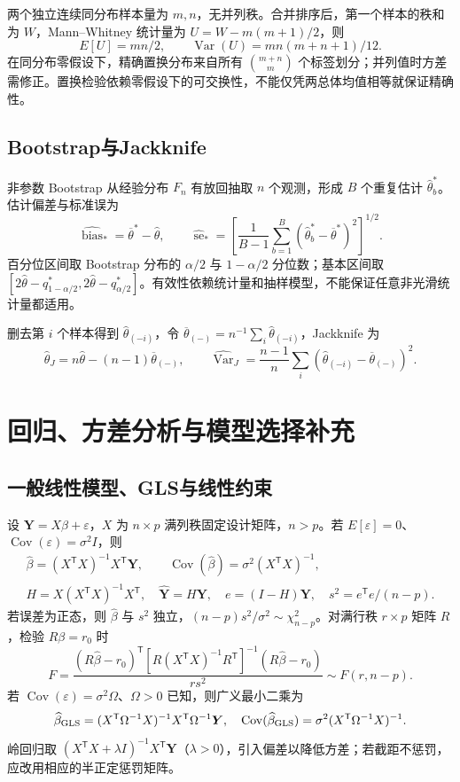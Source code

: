 \documentclass[../main.tex]{subfiles}
\begin{document}
两个独立连续同分布样本量为 $m,n$，无并列秩。合并排序后，第一个样本的秩和为 $W$，Mann--Whitney 统计量为 $U=W-m(m+1)/2$，则
\[
E[U]=mn/2,\qquad\operatorname{Var}(U)=mn(m+n+1)/12.
\]
在同分布零假设下，精确置换分布来自所有 $\binom{m+n}m$ 个标签划分；并列值时方差需修正。置换检验依赖零假设下的可交换性，不能仅凭两总体均值相等就保证精确性。

\subsection{Bootstrap与Jackknife}
非参数 Bootstrap 从经验分布 $F_n$ 有放回抽取 $n$ 个观测，形成 $B$ 个重复估计 $\widehat\theta_b^*$。估计偏差与标准误为
\[
\widehat{\operatorname{bias}}_* =\overline\theta^*-\widehat\theta,\qquad
\widehat{\operatorname{se}}_* =\left[\frac1{B-1}\sum_{b=1}^B(\widehat\theta_b^*-\overline\theta^*)^2\right]^{1/2}.
\]
百分位区间取 Bootstrap 分布的 $\alpha/2$ 与 $1-\alpha/2$ 分位数；基本区间取 $[2\widehat\theta-q^*_{1-\alpha/2},2\widehat\theta-q^*_{\alpha/2}]$。有效性依赖统计量和抽样模型，不能保证任意非光滑统计量都适用。

删去第 $i$ 个样本得到 $\widehat\theta_{(-i)}$，令 $\overline\theta_{(-)}=n^{-1}\sum_i\widehat\theta_{(-i)}$，Jackknife 为
\[
\widehat\theta_J=n\widehat\theta-(n-1)\overline\theta_{(-)},\qquad
\widehat{\operatorname{Var}}_J=\frac{n-1}n\sum_i(\widehat\theta_{(-i)}-\overline\theta_{(-)})^2.
\]

\section{回归、方差分析与模型选择补充}
\subsection{一般线性模型、GLS与线性约束}
设 $\bm Y=X\beta+\varepsilon$，$X$ 为 $n\times p$ 满列秩固定设计矩阵，$n>p$。若 $E[\varepsilon]=0$、$\operatorname{Cov}(\varepsilon)=\sigma^2I$，则
\begin{gather*}
\widehat\beta=(X^{\mathsf T}X)^{-1}X^{\mathsf T}\bm Y,\qquad
\operatorname{Cov}(\widehat\beta)=\sigma^2(X^{\mathsf T}X)^{-1},\\
H=X(X^{\mathsf T}X)^{-1}X^{\mathsf T},\quad \widehat{\bm Y}=H\bm Y,\quad
e=(I-H)\bm Y,\quad s^2=e^{\mathsf T}e/(n-p).
\end{gather*}
若误差为正态，则 $\widehat\beta$ 与 $s^2$ 独立，$(n-p)s^2/\sigma^2\sim\chi^2_{n-p}$。对满行秩 $r\times p$ 矩阵 $R$，检验 $R\beta=r_0$ 时
\[
F=\frac{(R\widehat\beta-r_0)^{\mathsf T}[R(X^{\mathsf T}X)^{-1}R^{\mathsf T}]^{-1}(R\widehat\beta-r_0)}{r s^2}
\sim F(r,n-p).
\]
若 $\operatorname{Cov}(\varepsilon)=\sigma^2\Omega$、$\Omega>0$ 已知，则广义最小二乘为
\[
\widehat\beta_{\rm GLS}=(X^{\mathsf T}\Omega^{-1}X)^{-1}X^{\mathsf T}\Omega^{-1}\bm Y,
\quad \operatorname{Cov}(\widehat\beta_{\rm GLS})=\sigma^2(X^{\mathsf T}\Omega^{-1}X)^{-1}.
\]
岭回归取 $(X^{\mathsf T}X+\lambda I)^{-1}X^{\mathsf T}\bm Y$（$\lambda>0$），引入偏差以降低方差；若截距不惩罚，应改用相应的半正定惩罚矩阵。
\end{document}
